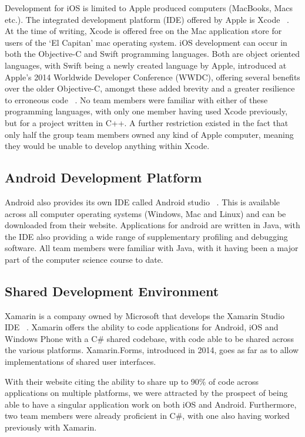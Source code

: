 \documentclass[main.tex]{subfiles}
\begin{document}
Development for iOS is limited to Apple produced computers (MacBooks, Macs etc.). The integrated development platform (IDE) offered by Apple is Xcode ~\cite{xcode}. At the time of writing, Xcode is offered free on the Mac application store for users of the `El Capitan' mac operating system. iOS development can occur in both the Objective-C and Swift programming languages. Both are object oriented languages, with Swift being a newly created language by Apple, introduced at Apple's 2014 Worldwide Developer Conference (WWDC), offering several benefits over the older Objective-C, amongst these added brevity and a greater resilience to erroneous code ~\cite{swift}. No team members were familiar with either of these programming languages, with only one member having used Xcode previously, but for a project written in C++. A further restriction existed in the fact that only half the group team members owned any kind of Apple computer, meaning they would be unable to develop anything within Xcode.

\subsection{Android Development Platform}

Android also provides its own IDE called Android studio ~\cite{androidStudio}. This is available across all computer operating systems (Windows, Mac and Linux) and can be downloaded from their website. Applications for android are written in Java, with the IDE also providing a wide range of supplementary profiling and debugging software. All team members were familiar with Java, with it having been a major part of the computer science course to date.

\subsection{Shared Development Environment}

Xamarin is a company owned by Microsoft that develops the Xamarin Studio IDE ~\cite{xamarin}. Xamarin offers the ability to code applications for Android, iOS and Windows Phone with a C\# shared codebase, with code able to be shared across the various platforms. Xamarin.Forms, introduced in 2014, goes as far as to allow implementations of shared user interfaces.

With their website citing the ability to share up to 90\% of code across applications on multiple platforms, we were attracted by the prospect of being able to have a singular application work on both iOS and Android. Furthermore, two team members were already proficient in C\#, with one also having worked previously with Xamarin.

 
\end{document}
